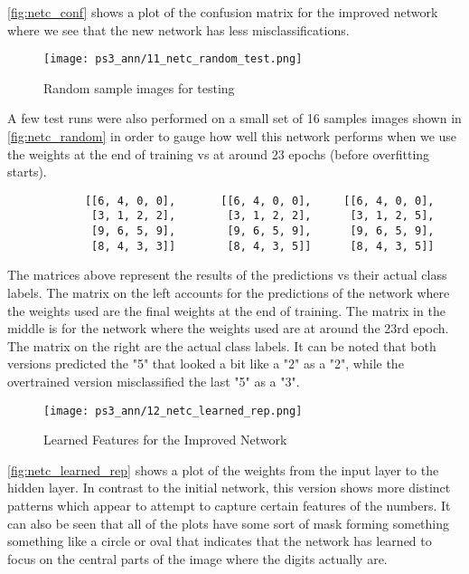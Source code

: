 \documentclass{article} %
\theoremstyle{definition}
\theoremstyle{remark}
\theoremstyle{plain}
\begin{document}
\autoref{fig:netc_conf} shows a plot of the confusion matrix for the improved network where we see that the new network has less misclassifications.


\begin{figure}[h!]
    \centering
    \texttt{[image: ps3\_ann/11\_netc\_random\_test.png]}
    \caption{Random sample images for testing}
    \label{fig:netc_random}
\end{figure}

A few test runs were also performed on a small set of 16 samples images shown in \autoref{fig:netc_random} in order to gauge how well this network performs when we use the weights at the end of training vs at around 23 epochs (before overfitting starts).

\begin{verbatim}
            [[6, 4, 0, 0],       [[6, 4, 0, 0],     [[6, 4, 0, 0],
             [3, 1, 2, 2],        [3, 1, 2, 2],      [3, 1, 2, 5],
             [9, 6, 5, 9],        [9, 6, 5, 9],      [9, 6, 5, 9],
             [8, 4, 3, 3]]        [8, 4, 3, 5]]      [8, 4, 3, 5]]
\end{verbatim}  
The matrices above represent the results of the predictions vs their actual class labels. The matrix on the left accounts for the predictions of the network where the weights used are the final weights at the end of training. The matrix in the middle is for the network where the weights used are at around the 23rd epoch. The matrix on the right are the actual class labels. It can be noted that both versions predicted the "5" that looked a bit like a "2" as a "2", while the overtrained version misclassified the last "5" as a "3".

\begin{figure}[h!]
    \centering
    \texttt{[image: ps3\_ann/12\_netc\_learned\_rep.png]}
    \caption{Learned Features for the Improved Network}
    \label{fig:netc_learned_rep}
\end{figure}

\autoref{fig:netc_learned_rep} shows a plot of the weights from the input layer to the hidden layer. In contrast to the initial network, this version shows more distinct patterns which appear to attempt to capture certain features of the numbers. It can also be seen that all of the plots have some sort of mask forming something something like a circle or oval that indicates that the network has learned to focus on the central parts of the image where the digits actually are.
\end{document}
